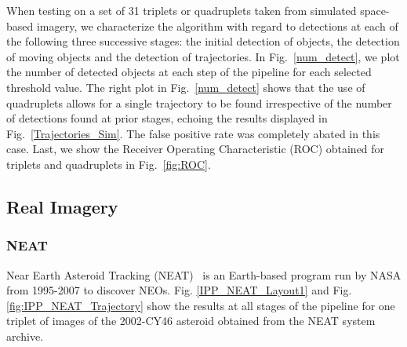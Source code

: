 When testing on a set of 31 triplets or quadruplets taken from simulated space-based imagery, we characterize the algorithm with regard to detections at each of the following three successive stages: the initial detection of objects, the detection of moving objects and the detection of trajectories.
In Fig.~\ref{num_detect}, we plot the number of detected objects at each step of the pipeline for each selected threshold value. 
The right plot in Fig.~\ref{num_detect} shows that the use of quadruplets allows for a single trajectory to be found irrespective of the number of detections found at prior stages, 
echoing the results displayed in Fig.~\ref{Trajectories_Sim}. The false positive rate was completely abated in this case.
%
Last, we show the Receiver Operating Characteristic (ROC) obtained for triplets and quadruplets in Fig.~\ref{fig:ROC}.
%
\vspace{-0.4cm}
\subsection{Real Imagery}

\subsubsection{NEAT}
Near Earth Asteroid Tracking (NEAT)~\cite{neat2014} is an Earth-based program run by NASA from 1995-2007 to discover NEOs.
Fig. \ref{IPP_NEAT_Layout1} and Fig. \ref{fig:IPP_NEAT_Trajectory} show the results at all stages of the pipeline for one triplet of images of the 2002-CY46 asteroid obtained from the NEAT system archive. 
 
